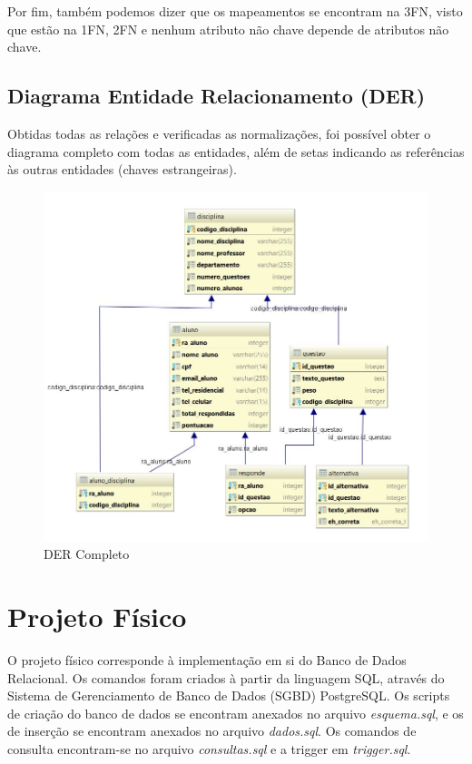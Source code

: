 \documentclass[12pt,a4paper]{article}
\begin{document}
Por fim, também podemos dizer que os mapeamentos se encontram na 3FN, visto que estão na 1FN, 2FN e nenhum atributo não chave depende de atributos não chave.

\subsection{Diagrama Entidade Relacionamento (DER)}

Obtidas todas as relações e verificadas as normalizações, foi possível obter o diagrama completo com todas as entidades, além de setas indicando as referências às outras entidades (chaves estrangeiras).

\begin{center}
\begin{figure}[!h]
    \centering
    \includegraphics[width=13.5cm, scale=0.5]{mapeamento.jpg}
    \caption{DER Completo}
    \label{fig:DERcompleto}
\end{figure}
\end{center}

\newpage
\section{Projeto Físico}

O projeto físico corresponde à implementação em si do Banco de Dados Relacional. Os comandos foram criados à partir da linguagem SQL, através do Sistema de Gerenciamento de Banco de Dados (SGBD) PostgreSQL. Os scripts de criação do banco de dados se encontram anexados no arquivo \textit{esquema.sql}, e os de inserção se encontram anexados no arquivo \textit{dados.sql}. Os comandos de consulta encontram-se no arquivo \textit{consultas.sql} e a trigger em \textit{trigger.sql}. 
\end{document}

